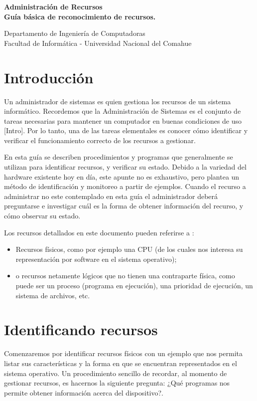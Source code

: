 \documentclass[12pt]{article}
\def\maketitle{

 \makeatletter
 {\color{bl} \centering \huge \sc \textbf{
 Administración de Recursos \\ 
\large \vspace*{-8pt} \color{black} Guía básica de reconocimiento de recursos. 
 \vspace*{8pt} }\par}
 \makeatother


 \makeatletter
 {\centering \small 
 	Departamento de Ingeniería de Computadoras \\
 	Facultad de Informática - Universidad Nacional del Comahue \\
 	\vspace{20pt} }
 \makeatother

}
\begin{document}
\thispagestyle{empty}
\maketitle
\setlength{\parindent}{0pt}

\section*{Introducción}

Un administrador de sistemas es quien gestiona los recursos de un sistema informático. 
Recordemos que la Administración de Sistemas es el conjunto de tareas necesarias para mantener
un computador en buenas condiciones de uso [Intro].
Por lo tanto, una de las tareas elementales es conocer cómo
identificar y verificar el funcionamiento correcto de los recursos a gestionar.

En esta guía se describen procedimientos y programas que generalmente se utilizan
para identificar recursos, y verificar su estado.
Debido a la variedad del hardware existente hoy en día, este apunte no es
exhaustivo, pero plantea un método de identificación y monitoreo a partir de ejemplos. 
Cuando 
el recurso a administrar no este contemplado en esta guía el administrador deberá preguntarse e
investigar cuál es la forma de obtener información del recurso, y cómo observar su estado.

Los recursos detallados en este documento pueden referirse a :

\begin{itemize}
	\item Recursos físicos, como por ejemplo una CPU (de los cuales nos interesa su representación por software en el sistema operativo);
	\item o recursos netamente lógicos que no tienen una
contraparte física, como puede ser un proceso (programa en ejecución), una prioridad de ejecución, 
un sistema de archivos, etc. 
\end{itemize}



\section*{Identificando recursos}

Comenzaremos por identificar recursos físicos con un ejemplo que nos permita
listar sus características y la forma en que 
se encuentran representados en el sistema operativo.
Un procedimiento sencillo de recordar, al momento de gestionar recursos, es hacernos la siguiente pregunta: 
¿Qué programas nos permite obtener información acerca del dispositivo?. 
\end{document}
